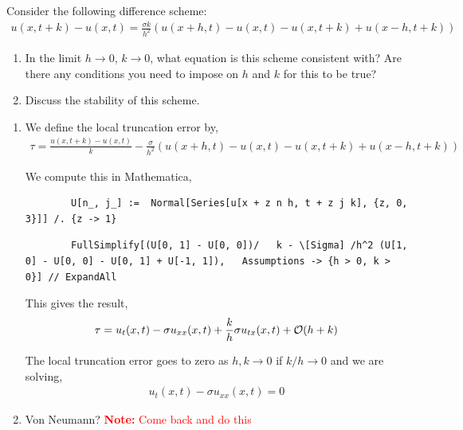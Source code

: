 \documentclass[10pt]{article}
\newcommand{\note}[1]{\textcolor{red}{\textbf{Note:} #1}}
\begin{document}
\begin{problem}
Consider the following difference scheme:
\begin{align*}
    u(x,t+k)- u(x,t) = \frac{\sigma k}{h^2} (u(x+h,t)-u(x,t)-u(x,t+k)+u(x-h,t+k))
\end{align*}
\begin{enumerate}[nolistsep,label=(\alph*)]
    \item In the limit \( h\to0 \), \( k\to 0 \), what equation is this scheme consistent with? Are there any conditions you need to impose on \( h \) and \( k \) for this to be true?
    \item Discuss the stability of this scheme.
\end{enumerate}
\end{problem}

\begin{solution}[Solution]
\begin{enumerate}[label=(\alph*)]
    \item We define the local truncation error by,
    \begin{align*}
        \tau = \frac{u(x,t+k) - u(x,t)}{k} - \frac{\sigma}{h^2} (u(x+h,t)-u(x,t)-u(x,t+k)+u(x-h,t+k))
    \end{align*}
    
        We compute this in Mathematica,
    \begin{lstlisting}
        U[n_, j_] :=  Normal[Series[u[x + z n h, t + z j k], {z, 0, 3}]] /. {z -> 1}
    \end{lstlisting}
    \begin{lstlisting}
        FullSimplify[(U[0, 1] - U[0, 0])/   k - \[Sigma] /h^2 (U[1, 0] - U[0, 0] - U[0, 1] + U[-1, 1]),   Assumptions -> {h > 0, k > 0}] // ExpandAll
    \end{lstlisting}

    This gives the result,
        \begin{align*}
            \tau = u_t(x,t) - \sigma u_{xx}(x,t) + \frac{k}{h}\sigma u_{tx}(x,t) + \mathcal{O}(h+k)    
        \end{align*}
       
    The local truncation error goes to zero as \( h,k\to 0 \) if \( k/h\to 0 \) and we are solving,
        \begin{align*}
            u_t(x,t) -\sigma u_{xx}(x,t) = 0
        \end{align*}
       
    \item

        Von Neumann?
        \note{Come back and do this}
\end{enumerate}
\end{solution}
\end{document}
